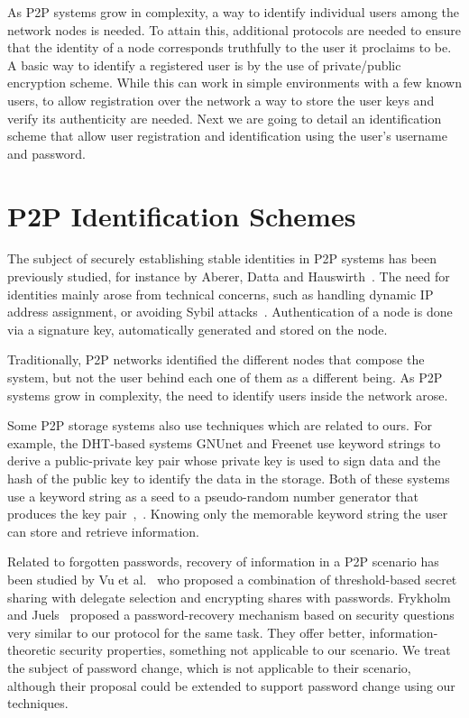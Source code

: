 As P2P systems grow in complexity, a way to identify individual users among the
network nodes is needed. To attain this, additional protocols are needed to
ensure that the identity of a node corresponds truthfully to the user it
proclaims to be. A basic way to identify a registered user is by the use of
private/public encryption scheme. While this can work in simple environments
with a few known users, to allow registration over the network a way to store
the user keys and verify its authenticity are needed.
Next we are going to detail an identification scheme that allow user
registration and identification using the user's username and password.

\section{P2P Identification Schemes}

The subject of securely establishing stable identities in P2P
systems has been previously studied, for instance by Aberer,
Datta and Hauswirth~\cite{1318567}. The need for identities mainly arose
from technical concerns, such as handling dynamic IP address
assignment, or avoiding Sybil attacks~\cite{the_sybil_attack}. Authentication of a
node is done via a signature key, automatically generated and
stored on the node.

Traditionally, P2P networks identified the different nodes that compose the
system, but not the user behind each one of them as a different being.
As P2P systems grow in complexity, the need to identify users inside the
network arose.

Some P2P storage systems also use techniques which are
related to ours. For example, the DHT-based systems GNUnet
and Freenet use keyword strings to derive a public-private key
pair whose private key is used to sign data and the hash of
the public key to identify the data in the storage. Both of
these systems use a keyword string as a seed to a pseudo-random number
generator that produces the key pair~\cite{clarke2010private},~\cite{Bennett03anencoding}.
Knowing only the memorable keyword string the user can
store and retrieve information.

Related to forgotten passwords, recovery of information in a
P2P scenario has been studied by Vu et al.~\cite{5380695} who proposed
a combination of threshold-based secret sharing with delegate
selection and encrypting shares with passwords.
Frykholm and Juels~\cite{Frykholm:2001:EPR:501983.501985} proposed a password-recovery
mechanism based on security questions very similar to our
protocol for the same task. They offer better, information-
theoretic security properties, something not applicable to our
scenario. We treat the subject of password change, which is not applicable to
their scenario, although their proposal could be extended to support password
change using our techniques.


